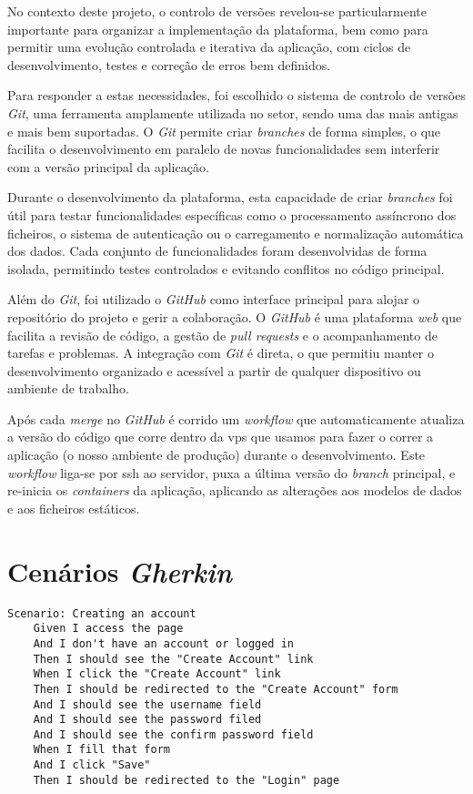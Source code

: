 No contexto deste projeto, o controlo de versões revelou-se particularmente importante para organizar a implementação da plataforma, bem como para permitir uma evolução controlada e iterativa da aplicação, com ciclos de desenvolvimento, testes e correção de erros bem definidos.

Para responder a estas necessidades, foi escolhido o sistema de controlo de versões \textit{Git}, uma ferramenta amplamente utilizada no setor, sendo uma das mais antigas e mais bem suportadas. O \textit{Git} permite criar \textit{branches} de forma simples, o que facilita o desenvolvimento em paralelo de novas funcionalidades sem interferir com a versão principal da aplicação.

Durante o desenvolvimento da plataforma, esta capacidade de criar \textit{branches} foi útil para testar funcionalidades específicas como o processamento assíncrono dos ficheiros, o sistema de autenticação ou o carregamento e normalização automática dos dados. Cada conjunto de funcionalidades foram desenvolvidas de forma isolada, permitindo testes controlados e evitando conflitos no código principal.

Além do \textit{Git}, foi utilizado o \textit{GitHub} como interface principal para alojar o repositório do projeto e gerir a colaboração. O \textit{GitHub} é uma plataforma \textit{web} que facilita a revisão de código, a gestão de \textit{pull requests} e o acompanhamento de tarefas e problemas. A integração com \textit{Git} é direta, o que permitiu manter o desenvolvimento organizado e acessível a partir de qualquer dispositivo ou ambiente de trabalho.

Após cada \textit{merge} no \textit{GitHub} é corrido um \textit{workflow} que automaticamente atualiza a versão do código que corre dentro da \gls{vps} que usamos para fazer o correr a aplicação (o nosso ambiente de produção) durante o desenvolvimento. Este \textit{workflow} liga-se por \gls{ssh} ao servidor, puxa a última versão do \textit{branch} principal, e re-inicia os \textit{containers} da aplicação, aplicando as alterações aos modelos de dados e aos ficheiros estáticos.

\chapter{Cenários \textit{Gherkin}}
\label{ch:cenariosGherkin}

\begin{verbatim}
Scenario: Creating an account
    Given I access the page 
    And I don't have an account or logged in
    Then I should see the "Create Account" link
    When I click the "Create Account" link
    Then I should be redirected to the "Create Account" form
    And I should see the username field
    And I should see the password filed
    And I should see the confirm password field
    When I fill that form
    And I click "Save"
    Then I should be redirected to the "Login" page
\end{verbatim}



